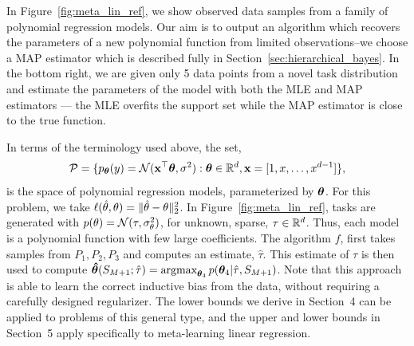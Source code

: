 In Figure~\ref{fig:meta_lin_ref}, we show observed data samples from a family of polynomial
regression models. Our aim is to output an algorithm which recovers the parameters of a new polynomial function from limited observations--we choose a MAP estimator which is described fully in
Section~\ref{sec:hierarchical_bayes}. In the bottom right, we are given only 5 data points from a
novel task distribution and estimate the parameters of the model with both the MLE and MAP
estimators --- the MLE overfits the support set while the MAP estimator is close to the true function.

In terms of the terminology used above, the set,
\[\mathcal{P} = \{p_{\bm{\theta}}(y)=\mathcal{N}(\mathbf{x}^\top \bm{\theta},\sigma^2): \bm{\theta} \in \mathbb{R}^{d}, \mathbf{x}=[1,x,\ldots,x^{d-1}]\},\]
is the space of polynomial regression models, parameterized by $\bm{\theta}$. For this problem, we take $\ell(\hat{\theta}, \theta) = \lVert \hat{\theta} - \theta \rVert_2^2$. In Figure~\ref{fig:meta_lin_ref}, tasks are generated with $p(\theta) = \mathcal{N}(\tau, \sigma^2_\theta)$, for unknown, sparse, $\tau \in \mathbb{R}^d$. Thus, each model is a polynomial function with few large coefficients. The algorithm $f$, first takes samples from $P_1,P_2,P_3$ and computes an estimate, $\hat{\tau}$. This estimate of $\tau$ is then used to compute $\bm{\hat{\theta}}(S_{M+1}; \hat{\tau}) = \operatorname*{\textrm{argmax}}_{\bm{\theta}_4} p(\bm{\theta}_4|\hat{\tau}, S_{M+1})$. Note that this approach is able to learn the correct inductive bias from the data, without requiring a carefully designed regularizer.  The lower bounds we derive in Section~4 can be applied to problems of this general type, and the upper and lower bounds in Section~5 apply specifically to meta-learning linear regression.